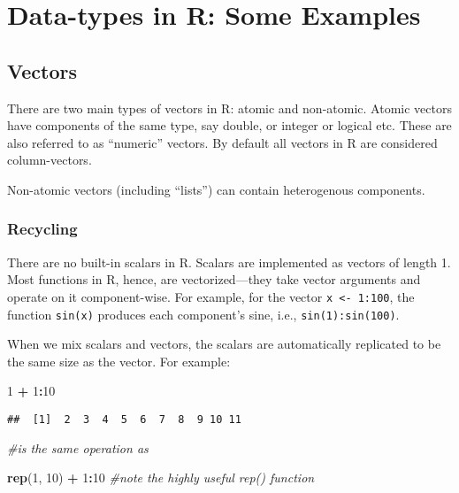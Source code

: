\documentclass[11pt,]{article}
\newenvironment{Shaded}{\begin{snugshade}}{\end{snugshade}}
\newcommand{\KeywordTok}[1]{\textcolor[rgb]{0.13,0.29,0.53}{\textbf{#1}}}
\newcommand{\DecValTok}[1]{\textcolor[rgb]{0.00,0.00,0.81}{#1}}
\newcommand{\StringTok}[1]{\textcolor[rgb]{0.31,0.60,0.02}{#1}}
\newcommand{\CommentTok}[1]{\textcolor[rgb]{0.56,0.35,0.01}{\textit{#1}}}
\newcommand{\OperatorTok}[1]{\textcolor[rgb]{0.81,0.36,0.00}{\textbf{#1}}}
\newcommand{\NormalTok}[1]{#1}
\begin{document}
\section{Data-types in R: Some
Examples}\label{data-types-in-r-some-examples}

\subsection{Vectors}\label{vectors}

There are two main types of vectors in R: atomic and non-atomic. Atomic
vectors have components of the same type, say double, or integer or
logical etc. These are also referred to as ``numeric'' vectors. By
default all vectors in R are considered column-vectors.

Non-atomic vectors (including ``lists'') can contain heterogenous
components.

\subsubsection{Recycling}\label{recycling}

There are no built-in scalars in R. Scalars are implemented as vectors
of length 1. Most functions in R, hence, are vectorized---they take
vector arguments and operate on it component-wise. For example, for the
vector \texttt{x\ \textless{}-\ 1:100}, the function \texttt{sin(x)}
produces each component's sine, i.e., \texttt{sin(1):sin(100)}.

When we mix scalars and vectors, the scalars are automatically
replicated to be the same size as the vector. For example:

\begin{Shaded}
\begin{Highlighting}[]
\DecValTok{1} \OperatorTok{+}\StringTok{ }\DecValTok{1}\OperatorTok{:}\DecValTok{10}
\end{Highlighting}
\end{Shaded}

\begin{verbatim}
##  [1]  2  3  4  5  6  7  8  9 10 11
\end{verbatim}

\begin{Shaded}
\begin{Highlighting}[]
\CommentTok{#is the same operation as }

\KeywordTok{rep}\NormalTok{(}\DecValTok{1}\NormalTok{, }\DecValTok{10}\NormalTok{) }\OperatorTok{+}\StringTok{ }\DecValTok{1}\OperatorTok{:}\DecValTok{10} \CommentTok{#note the highly useful rep() function}
\end{Highlighting}
\end{Shaded}
\end{document}
